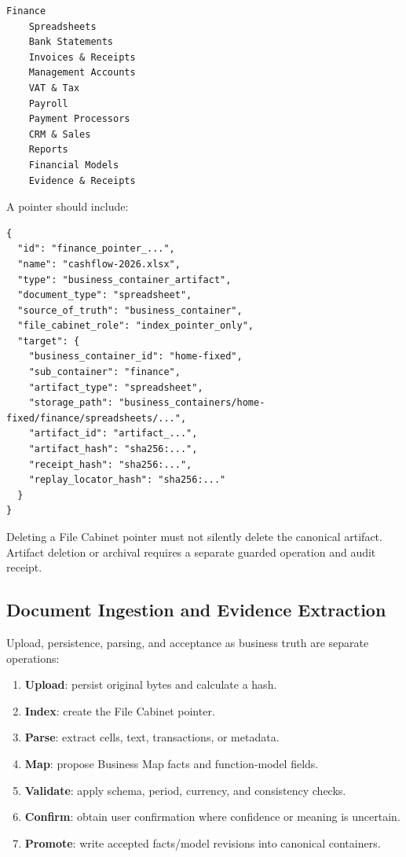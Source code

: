 \begin{verbatim}
Finance
    Spreadsheets
    Bank Statements
    Invoices & Receipts
    Management Accounts
    VAT & Tax
    Payroll
    Payment Processors
    CRM & Sales
    Reports
    Financial Models
    Evidence & Receipts
\end{verbatim}

A pointer should include:

\begin{verbatim}
{
  "id": "finance_pointer_...",
  "name": "cashflow-2026.xlsx",
  "type": "business_container_artifact",
  "document_type": "spreadsheet",
  "source_of_truth": "business_container",
  "file_cabinet_role": "index_pointer_only",
  "target": {
    "business_container_id": "home-fixed",
    "sub_container": "finance",
    "artifact_type": "spreadsheet",
    "storage_path": "business_containers/home-fixed/finance/spreadsheets/...",
    "artifact_id": "artifact_...",
    "artifact_hash": "sha256:...",
    "receipt_hash": "sha256:...",
    "replay_locator_hash": "sha256:..."
  }
}
\end{verbatim}

Deleting a File Cabinet pointer must not silently delete the canonical artifact.
Artifact deletion or archival requires a separate guarded operation and audit
receipt.

\subsection{Document Ingestion and Evidence Extraction}

Upload, persistence, parsing, and acceptance as business truth are separate
operations:

\begin{enumerate}
  \item \textbf{Upload}: persist original bytes and calculate a hash.
  \item \textbf{Index}: create the File Cabinet pointer.
  \item \textbf{Parse}: extract cells, text, transactions, or metadata.
  \item \textbf{Map}: propose Business Map facts and function-model fields.
  \item \textbf{Validate}: apply schema, period, currency, and consistency checks.
  \item \textbf{Confirm}: obtain user confirmation where confidence or meaning
  is uncertain.
  \item \textbf{Promote}: write accepted facts/model revisions into canonical
  containers.
\end{enumerate}

